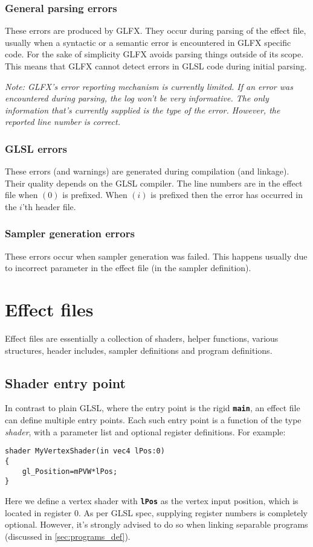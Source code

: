 \documentclass[11pt,a4paper,final,titlepage]{article}
\let\orgautoref\autoref
\renewcommand{\autoref}{%
\def\sectionautorefname{Sec.}%
\def\subsectionautorefname{Sec.}%
\def\algocflineautorefname{Alg.}%
\def\lemmaautorefname{Lemma}%
\orgautoref}
\begin{document}
\subsubsection{General parsing errors}
These errors are produced by GLFX. They occur during parsing of the effect file, usually when
a syntactic or a semantic error is encountered in GLFX specific code.
For the sake of simplicity GLFX avoids parsing things outside of its scope.
This means that GLFX cannot detect errors in GLSL code during initial parsing.

\emph{Note: GLFX's error reporting mechanism is currently limited. If an error was encountered
during parsing, the log won't be very informative. The only information that's currently supplied
is the type of the error. However, the reported line number is correct.}

\subsubsection{GLSL errors}
These errors (and warnings) are generated during compilation (and linkage). Their quality depends on
the GLSL compiler. The line numbers are in the effect file when $(0)$ is prefixed. When $(i)$
is prefixed then the error has occurred in the $i$'th header file.

\subsubsection{Sampler generation errors}
These errors occur when sampler generation was failed. This happens usually due to incorrect
parameter in the effect file (in the sampler definition).

\pagebreak
\section{Effect files}\label{sec:effFiles}
Effect files are essentially a collection of shaders, helper functions, various structures, header
includes, sampler definitions and program definitions.

\subsection{Shader entry point}
In contrast to plain GLSL, where the entry point is the rigid \texttt{\textbf{main}}, an effect
file can define multiple entry points. Each such entry point is a function of the type
\emph{shader}, with a parameter list and optional register definitions. For example:
\begin{lstlisting}
shader MyVertexShader(in vec4 lPos:0)
{
	gl_Position=mPVW*lPos;
}
\end{lstlisting}
Here we define a vertex shader with \texttt{\textbf{lPos}} as the vertex input position, which is located
in register $0$. As per GLSL spec, supplying register numbers is completely optional. However, it's
strongly advised to do so when linking separable programs (discussed in \autoref{sec:programs_def}).
\end{document}
